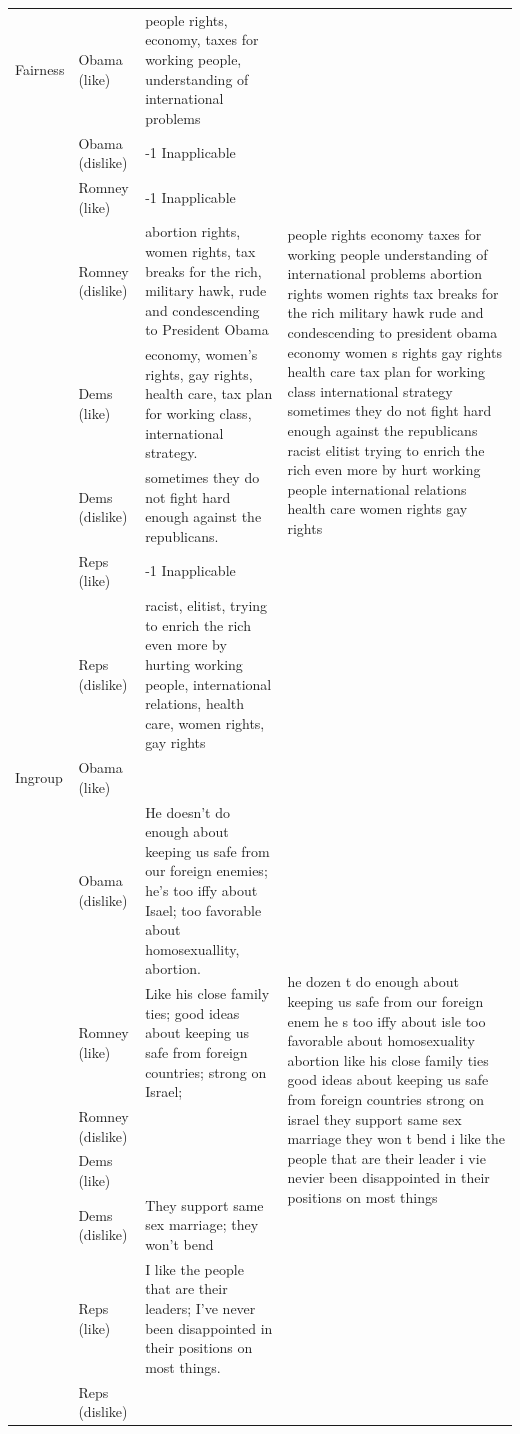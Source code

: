 \documentclass[12pt]{article}
\begin{document}
\begin{center}
\begin{longtable}{lp{1.5cm}p{5.5cm}p{5.5cm}}
	Fairness & Obama (like) & people rights, economy, taxes for working people, understanding of international problems & \multirow{8}{5.5cm}{people rights economy taxes for working people understanding of international problems abortion rights women rights tax breaks for the rich military hawk rude and condescending to president obama economy women s rights gay rights health care tax plan for working class international strategy sometimes they do not fight hard enough against the republicans racist elitist trying to enrich the rich even more by hurt working people international relations health care women rights gay rights} \\
	 & Obama (dislike) & -1 Inapplicable \\
	 & Romney (like) & -1 Inapplicable \\
	 & Romney (dislike) & abortion rights, women rights, tax breaks for the rich, military hawk, rude and condescending to President Obama \\
	 & Dems (like) & economy, women's rights, gay rights, health care, tax plan for working class, international strategy. \\
	 & Dems (dislike) & sometimes they do not fight hard enough against the republicans. \\
	 & Reps (like) & -1 Inapplicable \\
	 & Reps (dislike) & racist, elitist, trying to enrich the rich even more by hurting working people, international relations, health care, women rights, gay rights \\ \hline
	
	Ingroup & Obama (like) &  & \multirow{8}{5.5cm}{he dozen t do enough about keeping us safe from our foreign enem he s too iffy about isle too favorable about homosexuality abortion like his close family ties good ideas about keeping us safe from foreign countries strong on israel they support same sex marriage they won t bend i like the people that are their leader i vie nevier been disappointed in their positions on most things} \\
	 & Obama (dislike) & He doesn't do enough about keeping us safe from our foreign enemies; he's too iffy about Isael; too favorable about homosexuallity, abortion. \\
	 & Romney (like) & Like his close family ties; good ideas about keeping us safe from foreign countries; strong on Israel; \\
	 & Romney (dislike) &  \\
	 & Dems (like) &  \\
	 & Dems (dislike) & They support same sex marriage; they won't bend \\
	 & Reps (like) & I like the people that are their leaders; I've never been disappointed in their positions on most things. \\
	 & Reps (dislike) &  \\ \hline
	 

\end{longtable}
\end{center}
\end{document}
